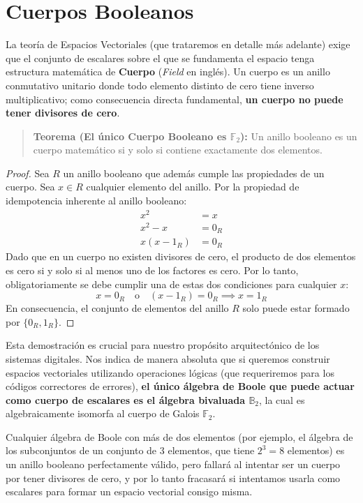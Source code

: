 \section{Cuerpos Booleanos}

La teoría de Espacios Vectoriales (que trataremos en detalle más adelante) exige que el conjunto de escalares sobre el que se fundamenta el espacio tenga estructura matemática de \textbf{Cuerpo} (\textit{Field} en inglés). Un cuerpo es un anillo conmutativo unitario donde todo elemento distinto de cero tiene inverso multiplicativo; como consecuencia directa fundamental, \textbf{un cuerpo no puede tener divisores de cero}.

\begin{quote}\textbf{Teorema (El único Cuerpo Booleano es $\mathbb{F}_2$):}\label{cuerpo_booleano}
Un anillo booleano es un cuerpo matemático si y solo si contiene exactamente dos elementos.
\end{quote}
\begin{proof}
Sea $R$ un anillo booleano que además cumple las propiedades de un cuerpo. Sea $x \in R$ cualquier elemento del anillo.
Por la propiedad de idempotencia inherente al anillo booleano:
\begin{align*}
x^2 &= x \\
x^2 - x &= 0_R \\
x(x - 1_R) &= 0_R
\end{align*}
Dado que en un cuerpo no existen divisores de cero, el producto de dos elementos es cero si y solo si al menos uno de los factores es cero. Por lo tanto, obligatoriamente se debe cumplir una de estas dos condiciones para cualquier $x:$
\[ x = 0_R \quad \text{o} \quad (x - 1_R) = 0_R \implies x = 1_R \]
En consecuencia, el conjunto de elementos del anillo $R$ solo puede estar formado por $\{0_R, 1_R\}.$ 
\end{proof}

Esta demostración es crucial para nuestro propósito arquitectónico de los sistemas digitales. Nos indica de manera absoluta que si queremos construir espacios vectoriales utilizando operaciones lógicas (que requeriremos para los códigos correctores de errores), \textbf{el único álgebra de Boole que puede actuar como cuerpo de escalares es el álgebra bivaluada $\mathbb{B}_2$}, la cual es algebraicamente isomorfa al cuerpo de Galois $\mathbb{F}_2.$ 

Cualquier álgebra de Boole con más de dos elementos (por ejemplo, el álgebra de los subconjuntos de un conjunto de 3 elementos, que tiene $2^3=8$ elementos) es un anillo booleano perfectamente válido, pero fallará al intentar ser un cuerpo por tener divisores de cero, y por lo tanto fracasará si intentamos usarla como escalares para formar un espacio vectorial consigo misma.
